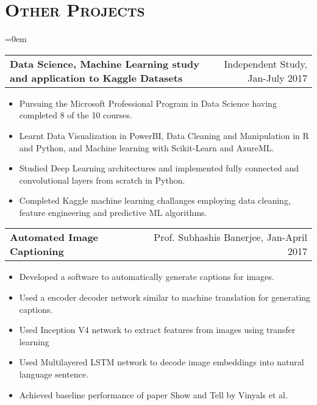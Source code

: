 \documentclass{article}
\makeatletter
\newenvironment{longversion}{}{} %
\newcommand{\headerrow}[2]
{\begin{tabular*}{\linewidth}{l@{\extracolsep{\fill}}r}
    #1 &
    #2 \\
\end{tabular*}}
\newcommand{\tmpsection}[1]{}
\let\tmpsection=\section
\renewcommand{\section}[1]{\tmpsection*{\textsc{#1}}}
\makeatother
\begin{document}
\begin{longversion}
\section{Other Projects}
\begin{list} {}{\leftmargin=0em}
\setlength{\leftmargin}{0pt}


\item[]
\headerrow {\textbf{Data Science, Machine Learning study and application to Kaggle Datasets}}{Independent Study, Jan-July 2017}
\begin{itemize}
\setlength\itemsep{0.0em}
    \item Pursuing the Microsoft Professional Program in Data Science having completed 8 of the 10 courses.
    \item Learnt Data Visualization in PowerBI, Data Cleaning and Manipulation in R and Python, and Machine learning with Scikit-Learn and AzureML.
    \item Studied Deep Learning architectures and implemented fully connected and convolutional layers from scratch in Python. 
    \item Completed Kaggle machine learning challanges employing data cleaning, feature engineering and predictive ML algorithms.
\end{itemize}


\item[]
\headerrow {\textbf{Automated Image Captioning}}{Prof. Subhashis Banerjee, Jan-April 2017}
\begin{itemize}
\setlength\itemsep{0.0em}
    \item Developed a software to automatically generate captions for images.
    \item Used a encoder decoder network similar to machine translation for generating captions.
    \item Used Inception V4 network to extract features from images using transfer learning
    \item Used Multilayered LSTM network to decode image embeddings into natural language sentence.
    \item Achieved baseline performance of paper Show and Tell by Vinyals et al.
\end{itemize}



\end{list}
\end{longversion}
\end{document}
